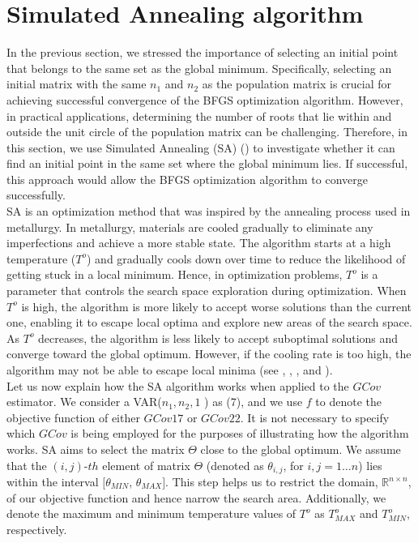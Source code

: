 \documentclass[<1p>]{elsarticle} %
\begin{document}
\section{Simulated Annealing algorithm}
In the previous section, we stressed the importance of selecting an initial point that belongs to the same set as the global minimum. Specifically, selecting an initial matrix with the same $n_1$ and $n_2$ as the population matrix is crucial for achieving successful convergence of the BFGS optimization algorithm. However, in practical applications, determining the number of roots that lie within and outside the unit circle of the population matrix can be challenging. Therefore, in this section, we use Simulated Annealing (SA) (\cite{goffe1994global}) to investigate whether it can find an initial point in the same set where the global minimum lies. If successful, this approach would allow the BFGS optimization algorithm to converge successfully.\\
\indent SA is an optimization method that was inspired by the annealing process used in metallurgy. In metallurgy, materials are cooled gradually to eliminate any imperfections and achieve a more stable state. The algorithm starts at a high temperature ($T^o$) and gradually cools down over time to reduce the likelihood of getting stuck in a local minimum. Hence, in optimization problems, $T^o$ is a parameter that controls the search space exploration during optimization. When $T^o$ is high, the algorithm is more likely to accept worse solutions than the current one, enabling it to escape local optima and explore new areas of the search space. As $T^o$ decreases, the algorithm is less likely to accept suboptimal solutions and converge toward the global optimum. However, if the cooling rate is too high, the algorithm may not be able to escape local minima (see \cite{corana1987minimizing}, \cite{goffe1992simulated}, \cite{goffe1994global}, and \cite{goffe1996simann}).\\
\indent Let us now explain how the SA algorithm works when applied to the $GCov$ estimator. We consider a VAR($ n_1, n_2, 1$ ) as (7), and we use $f$ to denote the objective function of either $GCov17$ or $GCov22$. It is not necessary to specify which $GCov$ is being employed for the purposes of illustrating how the algorithm works. SA aims to select the matrix $\Theta$ close to the global optimum. We assume that the $(i,j)$-$th$ element of matrix $\Theta$ (denoted as $\theta_{i,j}$, for $i,j=1 \dots n$) lies within the interval $[\theta_{MIN}$, $\theta_{MAX}]$. This step helps us to restrict the domain, $\mathbb{R}^{n \times n}$, of our objective function and hence narrow the search area. Additionally, we denote the maximum and minimum temperature values of $T^{o}$ as $T^{o}_{MAX}$ and $T^{o}_{MIN}$, respectively.\\
\end{document}
